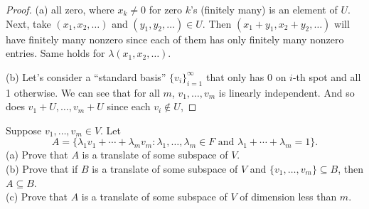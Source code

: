 \documentclass{extarticle}
\begin{document}
\begin{proof}
(a) all zero, where \(x_k \neq 0\) for zero \(k\)'s (finitely many) is an element of \(U\). Next, take \((x_1, x_2, \ldots)\)
and \((y_1, y_2, \ldots) \in U\). Then \((x_1 + y_1, x_2 + y_2, \ldots)\) will have finitely many nonzero
since each of them has only finitely many nonzero entries. Same holds for \(\lambda(x_1, x_2, \ldots)\). 

(b) Let's consider a ``standard basis'' \(\{v_i\}_{i=1}^\infty\) that only has 0 on \(i\)-th spot and all 1 otherwise. 
We can see that for all \(m\), \(v_1, \ldots, v_m\) is linearly independent. And so does \(v_1 + U, \ldots, 
v_m + U\) since each \(v_i \notin U\), 
\end{proof}

\begin{problem}{12}
    Suppose \(v_1, \ldots, v_m \in V\). Let 
    \[A = \{\lambda_1 v_1 + \cdots + \lambda_m v_m \colon \lambda_1, \ldots, \lambda_m \in F \text{ and }
    \lambda_1 + \cdots + \lambda_m = 1\}.\]
    (a) Prove that \(A\) is a translate of some subspace of \(V\). \\ 
    (b) Prove that if \(B\) is a translate of some subspace of \(V\) and \(\{v_1, \ldots, v_m\} \subseteq B\), 
    then \(A \subseteq B\). \\ 
    (c) Prove that \(A\) is a translate of some subspace of \(V\) of dimension less than \(m\). 
\end{problem}
\end{document}
